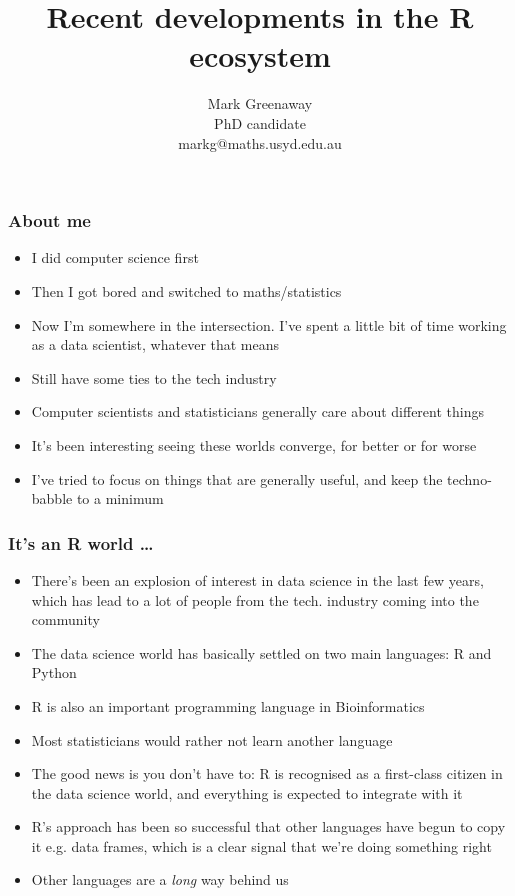 \documentclass{beamer}
\title{Recent developments in the R ecosystem}
\author{Mark Greenaway\\PhD candidate\\markg@maths.usyd.edu.au}
\begin{document}
\begin{frame}
\titlepage
\end{frame}

\begin{frame}
\frametitle{About me}
\begin{itemize}
\item I did computer science first
\item Then I got bored and switched to maths/statistics
\item Now I'm somewhere in the intersection. I've spent a little bit of time working
			as a data scientist, whatever that means
\item Still have some ties to the tech industry
\item Computer scientists and statisticians generally care about different things
\item It's been interesting seeing these worlds converge, for better or for worse
\item I've tried to focus on things that are generally useful, and keep the techno-babble to a
			minimum
\end{itemize}
\end{frame}

\begin{frame}
\frametitle{It's an R world \ldots}
\begin{itemize}
\item There's been an explosion of interest in data science in the last few years, which has 
			lead to a lot of people from the tech. industry coming into the community
\item The data science world has basically settled on two main languages: R and Python
\item R is also an important programming language in Bioinformatics
\item Most statisticians would rather not learn another language
\item The good news is you don't have to: R is recognised as a first-class citizen in the data
			science world, and everything is expected to integrate with it
\item R's approach has been so successful that other languages have begun to copy it e.g. 					data frames, which is a clear signal that we're doing something right
\item Other languages are a \emph{long} way behind us
\end{itemize}
\end{frame}
\end{document}
